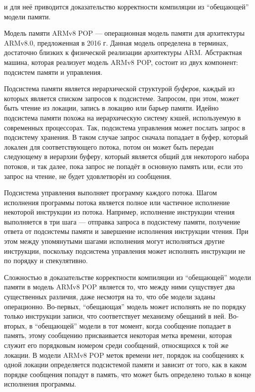 и для неё
приводится доказательство корректности компиляции из ``обещающей'' модели памяти.


Модель памяти ARMv8 POP --- операционная модель памяти для архитектуры ARMv8.0, предложенная в 2016 г.
Данная модель определена в терминах, достаточно близких к физической реализации архитектуры ARM.
Абстрактная машина, которая реализует модель ARMv8 POP, состоит из двух компонент: подсистем памяти и управления.

Подсистема памяти является иерархической структурой \emph{буферов}, каждый из которых является списком запросов к подсистеме.
Запросом, при этом, может быть чтение из локации, запись в локацию или барьер памяти.
Идейно подсистема памяти похожа на иерархическую систему кэшей, используемую в современных процессорах.
Так, подсистема управления может послать запрос в подсистему хранения. В таком случае запрос сначала попадает в буфер, который локален
для соответствующего потока, потом он может быть передан следующему в иерархии буферу, который является общий для некоторого
набора потоков, и так далее, пока запрос не попадёт в основную память или, если это запрос на чтение, не будет
удовлетворён из сообщения.

Подсистема управления выполняет программу каждого потока. Шагом исполнения программы потока является полное или частичное исполнение
некоторой инструкции из потока. Например, исполнение инструкции чтения выполняется в три шага --- отправка запроса в подсистему памяти,
получение ответа от подсистемы памяти и завершение исполнения инструкции чтения. При этом между упомянутыми шагами исполнения могут
исполняться другие инструкции, поскольку подсистема управления может исполнять инструкции не по порядку и спекулятивно.

Сложностью в доказательстве корректности компиляции из ``обещающей'' модели памяти в модель ARMv8 POP является то, что
между ними сущуствует два существенных различия, даже несмотря на то, что обе модели заданы операционно.
Во-первых, ``обещающая'' модель может исполнять не по порядку только инструкции записи, что соответствует механизму обещаний в ней.
Во-вторых, в ``обещающей'' модели в тот момент, когда сообщение попадает в память, этому сообщению присваивается некоторая
метка времени, которая служит его порядковым номером среди сообщений, относящихся к той же локации. В модели ARMv8 POP
меток времени нет, порядок на сообщениях к одной локации определяется подсистемой памяти и зависит от того, как в каком порядке
сообщения попадут в память, что может быть определено только в конце исполнения программы.

